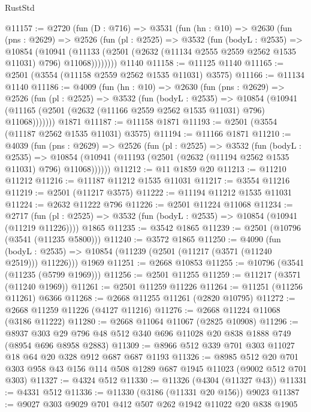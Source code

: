 \begin{lexlean}{RustStd}
\begin{coremodule}
{\begin{coremodule}
{{{{{{{{{{{{{{{{{{{{@11157 := @2720
    (fun (D : @716) =>
    @3531
      (fun (hn : @10) =>
      @2630
        (fun (pns : @2629) =>
        @2526
          (fun (pl : @2525) =>
          @3532
            (fun (bodyL : @2535) =>
            @10854
              (@10941
                (@11133 (@2501 (@2632 (@11134 @2555 @2559 @2562 @1535 @11031) @796) @11068))))))))
    @1140
@11158 := @11125 @1140
@11165 := @2501 (@3554 (@11158 @2559 @2562 @1535 @11031) @3575)
@11166 := @11134 @1140
@11186 := @4009
    (fun (hn : @10) =>
    @2630
      (fun (pns : @2629) =>
      @2526
        (fun (pl : @2525) =>
        @3532
          (fun (bodyL : @2535) =>
          @10854 (@10941 (@11165 (@2501 (@2632 (@11166 @2559 @2562 @1535 @11031) @796) @11068)))))))
    @1871
@11187 := @11158 @1871
@11193 := @2501 (@3554 (@11187 @2562 @1535 @11031) @3575)
@11194 := @11166 @1871
@11210 := @4039
    (fun (pns : @2629) =>
    @2526
      (fun (pl : @2525) =>
      @3532
        (fun (bodyL : @2535) =>
        @10854 (@10941 (@11193 (@2501 (@2632 (@11194 @2562 @1535 @11031) @796) @11068))))))
@11212 := @11 @1859 @20
@11213 := @11210 @11212
@11216 := @11187 @11212 @1535 @11031
@11217 := @3554 @11216
@11219 := @2501 (@11217 @3575)
@11222 := @11194 @11212 @1535 @11031
@11224 := @2632 @11222 @796
@11226 := @2501 @11224 @11068
@11234 := @2717
    (fun (pl : @2525) => @3532 (fun (bodyL : @2535) => @10854 (@10941 (@11219 @11226))))
    @1865
@11235 := @3542 @1865
@11239 := @2501 (@10796 (@3541 (@11235 @5800)))
@11240 := @3572 @1865
@11250 := @4090
    (fun (bodyL : @2535) => @10854 (@11239 (@2501 (@11217 (@3571 (@11240 @2519))) @11226)))
    @1969
@11251 := @2668 @10853
@11255 := @10796 (@3541 (@11235 (@5799 @1969)))
@11256 := @2501 @11255
@11259 := @11217 (@3571 (@11240 @1969))
@11261 := @2501 @11259 @11226
@11264 := @11251 (@11256 @11261) @6366
@11268 := @2668 @11255 @11261 (@2820 @10795)
@11272 := @2668 @11259 @11226 (@4127 @11216)
@11276 := @2668 @11224 @11068 (@3186 @11222)
@11280 := @2668 @11064 @11067 (@2825 @10908)
@11296 := @8937 @303 @29 @796 @48 @512 @340 @696 @11028 @20 @838 @1888 @749 (@8954 @696 @8958 @2883)
@11309 := @8966 @512 @339 @701 @303 @11027 @18 @64 @20 @328 @912 @687 @687 @1193
@11326 := @8985
    @512
    @20
    @701
    @303
    @958
    @43
    @156
    @114
    @508
    @1289
    @687
    @1945
    @11023
    (@9002 @512 @701 @303)
@11327 := @4324 @512
@11330 := @11326 (@4304 (@11327 @43))
@11331 := @4331 @512
@11336 := @11330 (@3186 (@11331 @20 @156)) @9023
@11387 := @9027
    @303
    @9029
    @701
    @412
    @507
    @262
    @1942
    @11022
    @20
    @838
    @1905
}}}}}}}}}}}}}}}}}}}}
\end{coremodule}}
\end{coremodule}
\end{lexlean}
